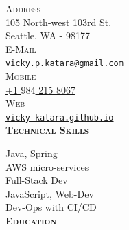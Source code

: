 \documentclass[letterpaper,12pt,final]{memoir}
\newcommand{\SmallSep}{\vspace{0.5em}}
\newcommand{\CVSection}[1]
	{\Large\textbf{\textsc{{#1}}}\par
	\SmallSep\normalsize\normalfont}
\newcommand{\CVItemSC}[1]
{{\textsc{\color{Plum} #1}}}
\begin{document}

\begin{flushright} 
	\footnotesize
	\SmallSep
	\CVItemSC{Address}\\%
	
	105 North-west 103rd St.\\
	Seattle, WA - 98177\\
	\SmallSep
	\CVItemSC{E-Mail}\\%
	\href{mailto:vicky.p.katara@gmail.com}{\texttt{vicky.p.katara@gmail.com}}\\
	\SmallSep
	\CVItemSC{Mobile}\\%
	\href{tel:+19842158067}{+1 \(984\) 215 8067}\\
	\SmallSep
	\SmallSep
	\CVItemSC{Web}\\%
	\href{https://vicky-katara.github.io/}{\texttt{vicky-katara.github.io}}\\
	\SmallSep
\CVSection{Technical Skills}
{\footnotesize Java, Spring}\\
{\footnotesize AWS micro-services}\\
{\footnotesize Full-Stack Dev}\\
{\footnotesize JavaScript, Web-Dev}\\
{\footnotesize Dev-Ops with CI/CD}\\
\SmallSep
\SmallSep
\CVSection{Education}



\end{flushright}
\end{document}
